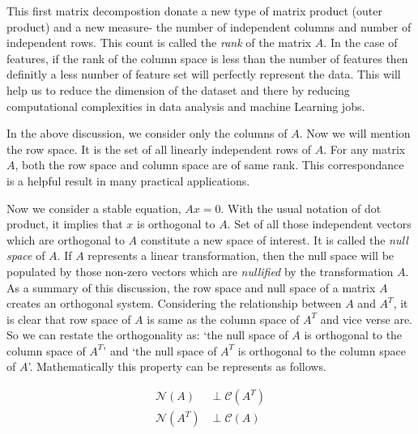\documentclass[
  letterpaper,
  DIV=11,
  numbers=noendperiod]{scrreprt}
\theoremstyle{plain}
\theoremstyle{definition}
\theoremstyle{remark}
\begin{document}
This first matrix decompostion donate a new type of matrix product
(outer product) and a new measure- the number of independent columns and
number of independent rows. This count is called the \emph{rank} of the
matrix \(A\). In the case of features, if the rank of the column space
is less than the number of features then definitly a less number of
feature set will perfectly represent the data. This will help us to
reduce the dimension of the dataset and there by reducing computational
complexities in data analysis and machine Learning jobs.

In the above discussion, we consider only the columns of \(A\). Now we
will mention the row space. It is the set of all linearly independent
rows of \(A\). For any matrix \(A\), both the row space and column space
are of same rank. This correspondance is a helpful result in many
practical applications.

Now we consider a stable equation, \(Ax=0\). With the usual notation of
dot product, it implies that \(x\) is orthogonal to \(A\). Set of all
those independent vectors which are orthogonal to \(A\) constitute a new
space of interest. It is called the \emph{null space} of \(A\). If \(A\)
represents a linear transformation, then the null space will be
populated by those non-zero vectors which are \emph{nullified} by the
transformation \(A\). As a summary of this discussion, the row space and
null space of a matrix \(A\) creates an orthogonal system. Considering
the relationship between \(A\) and \(A^T\), it is clear that row space
of \(A\) is same as the column space of \(A^T\) and vice verse are. So
we can restate the orthogonality as: `the null space of \(A\) is
orthogonal to the column space of \(A^T\)' and `the null space of
\(A^T\) is orthogonal to the column space of \(A\)'. Mathematically this
property can be represents as follows.

\begin{tcolorbox}[enhanced jigsaw, rightrule=.15mm, arc=.35mm, breakable, colback=white, toprule=.15mm, colframe=quarto-callout-note-color-frame, toptitle=1mm, opacityback=0, colbacktitle=quarto-callout-note-color!10!white, opacitybacktitle=0.6, title=\textcolor{quarto-callout-note-color}{\faInfo}\hspace{0.5em}{Note}, bottomrule=.15mm, left=2mm, titlerule=0mm, coltitle=black, bottomtitle=1mm, leftrule=.75mm]

\begin{align*}
\mathcal{N}(A)&\perp \mathcal{C}(A^T)\\
\mathcal{N}(A^T)&\perp \mathcal{C}(A)
\end{align*}

\end{tcolorbox}
\end{document}
